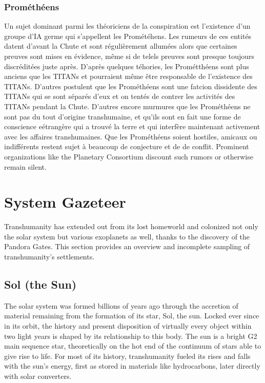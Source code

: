 \subsubsection{Prométhéens} \label{sec:prometheans} 

Un sujet dominant parmi les théoriciens de la conspiration est l'existence d'un groupe d'IA germe qui s'appellent les Prométéhens. Les rumeurs de ces entités datent d'avant la Chute et sont régulièrement allumées alors que certaines preuves sont mises en évidence, même si de telels preuves sont presque toujours discréditées juste après. D'après quelques téhories, les Prométthéens sont plus anciens que les TITANs et pourraient même être responsable de l'existence des TITANs. D'autres postulent que les Prométhéens sont une fatcion dissidente des TITANs qui se sont séparés d'eux et on tentés de contrer les activités des TITANs pendant la Chute. D'autres encore murmures que les Prométhéens ne sont pas du tout d'origine transhumaine, et qu'ils sont en fait une forme de conscience eétrangère qui a trouvé la terre et qui interfère maintenant activement avec les affaires transhumaines. Que les Prométhéens soient hostiles, amicaux ou indifférents restent sujet à beaucoup de conjecture et de de conflit. Prominent organizations like the Planetary Consortium discount such rumors or otherwise remain silent. 

\section{System Gazeteer} \label{sec:system-gazeteer} 

Transhumanity has extended out from its lost homeworld and colonized not only the solar system but various exoplanets as well, thanks to the discovery of the Pandora Gates. This section provides an overview and incomplete sampling of transhumanity's settlements. 

\subsection{Sol (the Sun)} \label{sec:sol-the-sun} 

The solar system was formed billions of years ago through the accretion of material remaining from the formation of its star, Sol, the sun. Locked ever since in its orbit, the history and present disposition of virtually every object within two light years is shaped by its relationship to this body. The sun is a bright G2 main sequence star, theoretically on the hot end of the continuum of stars able to give rise to life. For most of its history, transhumanity fueled its rises and falls with the sun's energy, first as stored in materials like hydrocarbons, later directly with solar converters. 


